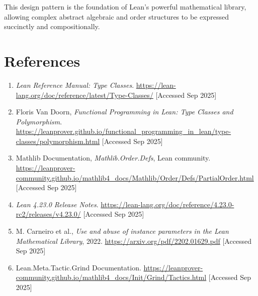 This design pattern is the foundation of Lean’s powerful mathematical library, allowing complex abstract algebraic and order structures to be expressed succinctly and compositionally.

\section*{References}

\begin{enumerate}
 \item \textit{Lean Reference Manual: Type Classes}. \url{https://lean-lang.org/doc/reference/latest/Type-Classes/} [Accessed Sep 2025] \label{ref:lean-type-classes}
 \item Floris Van Doorn, \textit{Functional Programming in Lean: Type Classes and Polymorphism}. \url{https://leanprover.github.io/functional_programming_in_lean/type-classes/polymorphism.html} [Accessed Sep 2025] \label{ref:fp-lean-typeclasses}
 \item Mathlib Documentation, \textit{Mathlib.Order.Defs}, Lean community. \url{https://leanprover-community.github.io/mathlib4_docs/Mathlib/Order/Defs/PartialOrder.html} [Accessed Sep 2025] \label{ref:mathlib-order-defs}
 \item \textit{Lean 4.23.0 Release Notes}. \url{https://lean-lang.org/doc/reference/4.23.0-rc2/releases/v4.23.0/} [Accessed Sep 2025] \label{ref:lean-release}
 \item M. Carneiro et al., \textit{Use and abuse of instance parameters in the Lean Mathematical Library}, 2022. \url{https://arxiv.org/pdf/2202.01629.pdf} [Accessed Sep 2025] \label{ref:instance-abuse}
 \item Lean.Meta.Tactic.Grind Documentation. \url{https://leanprover-community.github.io/mathlib4_docs/Init/Grind/Tactics.html} [Accessed Sep 2025] \label{ref:grind-tactic}
\end{enumerate}